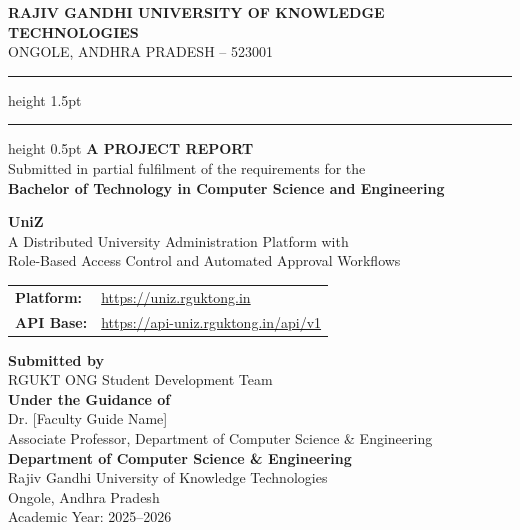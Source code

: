 \documentclass[12pt,a4paper]{report}
\begin{document}
\begin{titlepage}
\centering
\vspace*{0.5cm}
{\Large \textbf{RAJIV GANDHI UNIVERSITY OF KNOWLEDGE TECHNOLOGIES}}\\[0.3cm]
{\large ONGOLE, ANDHRA PRADESH -- 523001}\\[0.5cm]
\hrule height 1.5pt\vspace{0.3cm}\hrule height 0.5pt\vspace{0.8cm}
{\LARGE \textbf{A PROJECT REPORT}}\\[0.3cm]
{\large Submitted in partial fulfilment of the requirements for the}\\[0.2cm]
{\large \textbf{Bachelor of Technology in Computer Science and Engineering}}\\[1.2cm]
\begin{mdframed}[linewidth=1.5pt,innertopmargin=10pt,innerbottommargin=10pt]
\centering
{\Huge \textbf{UniZ}}\\[0.4cm]
{\Large A Distributed University Administration Platform with}\\[0.2cm]
{\Large Role-Based Access Control and Automated Approval Workflows}
\end{mdframed}
\vspace{1.2cm}
\begin{tabular}{ll}
\textbf{Platform:} & \url{https://uniz.rguktong.in} \\[4pt]
\textbf{API Base:} & \url{https://api-uniz.rguktong.in/api/v1} \\
\end{tabular}
\vspace{1.5cm}
{\large \textbf{Submitted by}}\\[0.4cm]
{\large RGUKT ONG Student Development Team}\\[0.8cm]
{\large \textbf{Under the Guidance of}}\\[0.3cm]
{\large Dr. [Faculty Guide Name]}\\[0.2cm]
{\normalsize Associate Professor, Department of Computer Science \& Engineering}\\[1.5cm]
{\normalsize\textbf{Department of Computer Science \& Engineering}\\
Rajiv Gandhi University of Knowledge Technologies\\
Ongole, Andhra Pradesh\\
Academic Year: 2025--2026}
\end{titlepage}
\end{document}

